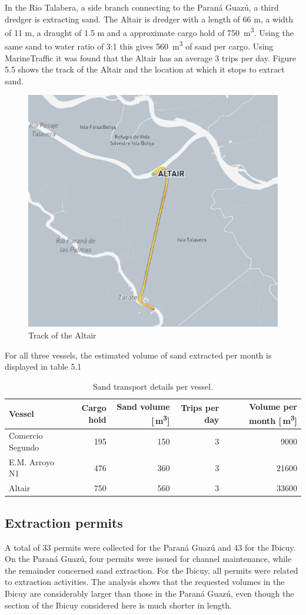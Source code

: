 In the Rio Talabera, a side branch connecting to the Paraná Guazú, a third dredger is extracting sand. The Altair is dredger with a length of 66 m, a width of 11 m, a draught of 1.5 m and a approximate cargo hold of 750 \,m\textsuperscript{3}. Using the same sand to water ratio of 3:1 this gives 560 \,m\textsuperscript{3} of sand per cargo. Using MarineTraffic it was found that the Altair has an average 3 trips per day. Figure 5.5 shows the track of the Altair and the location at which it stops to extract sand. 

\begin{figure}[H]
    \centering
    \includegraphics[width=0.5\linewidth]{figures/ch5/Track_Altair.png}
    \caption{Track of the Altair}
    \label{fig:placeholder}
\end{figure}

For all three vessels, the estimated volume of sand extracted per month is displayed in table 5.1
\begin{table}[h!]
\centering
\begin{tabular}{lrrrr}
\hline
\textbf{Vessel} & \textbf{Cargo hold} & \textbf{Sand volume [\,m\textsuperscript{3}]} & \textbf{Trips per day} & \textbf{Volume per month [\,m\textsuperscript{3}]} \\
\hline
Comercio Segundo & 195 & 150 & 3 & 9000 \\
E.M. Arroyo N1 & 476 & 360 & 3 & 21600 \\
Altair & 750 & 560 & 3 & 33600 \\
\hline
\end{tabular}
\caption{Sand transport details per vessel.}
\label{tab:sand_volume}
\end{table}


\subsection{Extraction permits}
A total of 33 permits were collected for the Paraná Guazú and 43 for the Ibicuy. On the Paraná Guazú, four permits were issued for channel maintenance, while the remainder concerned sand extraction. For the Ibicuy, all permits were related to extraction activities. The analysis shows that the requested volumes in the Ibicuy are considerably larger than those in the Paraná Guazú, even though the section of the Ibicuy considered here is much shorter in length.

